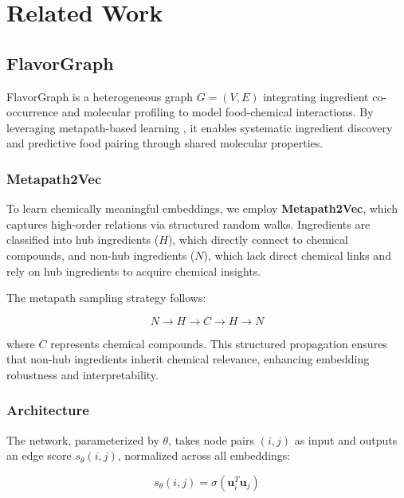\section{Related Work}

\subsection{FlavorGraph}

FlavorGraph \cite{Park2019} is a heterogeneous graph \( G = (V, E) \) integrating ingredient co-occurrence and molecular profiling to model food-chemical interactions. By leveraging metapath-based learning \cite{Dong2017}, it enables systematic ingredient discovery and predictive food pairing through shared molecular properties.

\subsubsection{Metapath2Vec}

To learn chemically meaningful embeddings, we employ \textbf{Metapath2Vec}, which captures high-order relations via structured random walks. Ingredients are classified into hub ingredients (\( H \)), which directly connect to chemical compounds, and non-hub ingredients (\( N \)), which lack direct chemical links and rely on hub ingredients to acquire chemical insights.

The metapath sampling strategy follows:

\begin{equation*}
    N \rightarrow H \rightarrow C \rightarrow H \rightarrow N
\end{equation*}

where \( C \) represents chemical compounds. This structured propagation ensures that non-hub ingredients inherit chemical relevance, enhancing embedding robustness and interpretability.

\subsubsection{Architecture}

The network, parameterized by \( \theta \), takes node pairs \( (i, j) \) as input and outputs an edge score \( s_{\theta}(i, j) \), normalized across all embeddings:

\begin{equation*}
    s_{\theta}(i, j) = \sigma(\mathbf{u}_i^T \mathbf{u}_j)
\end{equation*}


